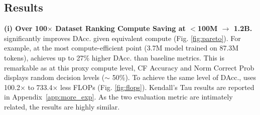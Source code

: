 
\subsection{Results} \label{sec:result}

\textbf{(i) Over 100$\times$ Dataset Ranking Compute Saving at $<$100M $\rightarrow$ 1.2B.}  significantly improves DAcc. given equivalent compute (Fig. \ref{fig:pareto}). For example, at the most compute-efficient point (3.7M model trained on 87.3M tokens),  achieves up to 27\% higher DAcc. than baseline metrics. This is remarkable as at this proxy compute level, CF Accuracy and Norm Correct Prob displays random decision levels ($\sim$ 50\%). To achieve the same level of DAcc.,  uses 100.2$\times$ to 733.4$\times$ less FLOPs (Fig. \ref{fig:flops}).
Kendall’s Tau results are reported in Appendix~\ref{app:more_exp}. As the two evaluation metric are intimately related, the results are highly similar.

